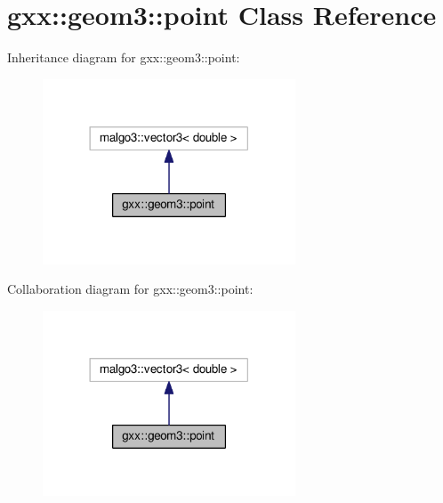 \hypertarget{classgxx_1_1geom3_1_1point}{}\section{gxx\+:\+:geom3\+:\+:point Class Reference}
\label{classgxx_1_1geom3_1_1point}


Inheritance diagram for gxx\+:\+:geom3\+:\+:point\+:
\nopagebreak
\begin{figure}[H]
\begin{center}
\leavevmode
\includegraphics[width=213pt]{classgxx_1_1geom3_1_1point__inherit__graph}
\end{center}
\end{figure}


Collaboration diagram for gxx\+:\+:geom3\+:\+:point\+:
\nopagebreak
\begin{figure}[H]
\begin{center}
\leavevmode
\includegraphics[width=213pt]{classgxx_1_1geom3_1_1point__coll__graph}
\end{center}
\end{figure}
